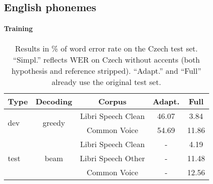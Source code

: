 \subsection{English phonemes}
\paragraph{Training}

\begin{table}[t]
	\small\centering
	\begin{tabular}{lcc|cc}
		\bf Type & \bf Decoding & \bf Corpus & \bf Adapt. & \bf Full \\
		\hline
		\multirow{2}{*}{dev} & \multirow{2}{*}{greedy} & Libri Speech Clean & 46.07 &   3.84 \\

		&& Common Voice & 54.69 &  11.86 \\
		
		\hline

		\multirow{3}{*}{test} & \multirow{3}{*}{beam} & Libri Speech Clean & - &  4.19  \\
		
		 && Libri Speech Other & - &  11.48  \\

		&& Common Voice & - &  12.56  \\
	\end{tabular}
	\caption{Results in \% of word error rate on the Czech test set. ``Simpl.'' reflects WER on Czech without accents (both hypothesis and reference stripped). ``Adapt.'' and ``Full'' already use the original test set.}
	\label{tab:en_phon_results}
\end{table}